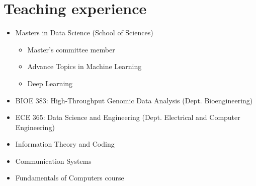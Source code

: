 \documentclass[11pt,a4paper,sans]{moderncv}        %
\begin{document}

%

\section{Teaching experience}
\begin{itemize}
\item Masters in Data Science  (School of Sciences)
\begin{itemize}
\item Master's committee member
\item Advance Topics in Machine Learning
\item Deep Learning
\end{itemize}
\end{itemize}
\vspace{10pt}

\begin{itemize}
\item BIOE 383: High-Throughput Genomic Data Analysis (Dept. Bioengineering)
\item ECE 365: Data Science and Engineering (Dept. Electrical and Computer Engineering)
\end{itemize}
\vspace{10pt}

\begin{itemize}
\item Information Theory and Coding
\item Communication Systems
\item Fundamentals of Computers course
\end{itemize}
\vspace{10pt}
\end{document}
